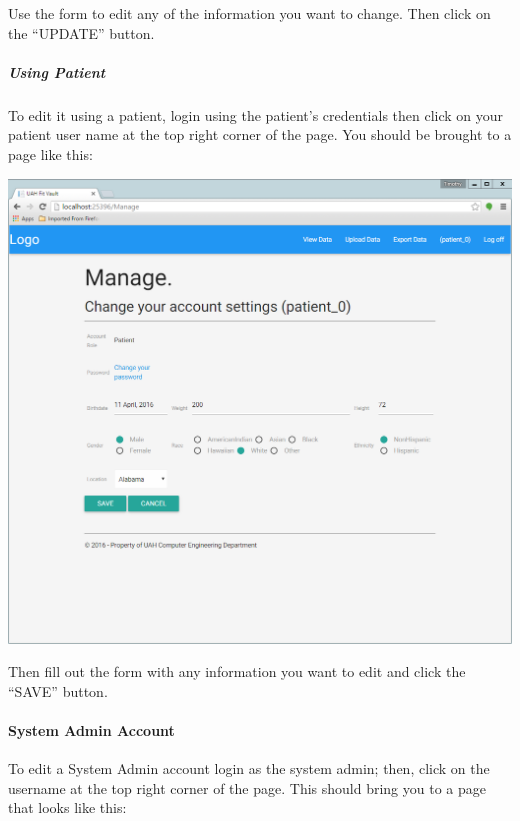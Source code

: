 \documentclass[letterpaper,10pt,english]{sphinxmanual}
\begin{document}
Use the form to edit any of the information you want to change. Then click on the ``UPDATE'' button.


\subparagraph{Using Patient}
\label{user_guide/account_edit:using-patient}
To edit it using a patient, login using the patient's credentials then click on your patient user name at the top
right corner of the page. You should be brought to a page like this:

\includegraphics{edit_patient_account_patient.png}

Then fill out the form with any information you want to edit and click the ``SAVE'' button.


\paragraph{System Admin Account}
\label{user_guide/account_edit:system-admin-account}
To edit a System Admin account login as the system admin; then, click on the username at the top right corner of the
page. This should bring you to a page that looks like this:
\end{document}
